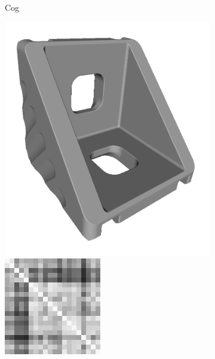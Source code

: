 \begin{figure}[ht]
\begin{subfigure}[b]{0.23\linewidth}
		\caption{Cog}
	\end{subfigure}
	\begin{subfigure}[b]{0.23\linewidth}
		\includegraphics[width=\linewidth]{fig/reg/bracket.png} \\
		\includegraphics[width=\linewidth]{fig/reg/reg3Dtrain_bracket.png} 

\end{subfigure}
\end{figure}
